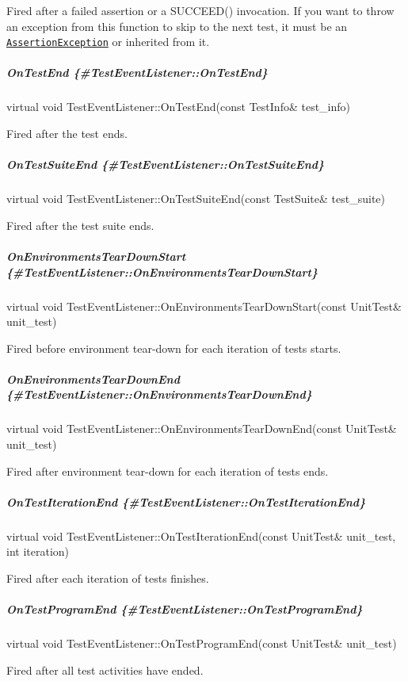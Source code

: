Fired after a failed assertion or a {\ttfamily S\+U\+C\+C\+E\+E\+D()} invocation. If you want to throw an exception from this function to skip to the next test, it must be an \href{#AssertionException}{\tt {\ttfamily Assertion\+Exception}} or inherited from it.

\subparagraph*{On\+Test\+End \{\#\+Test\+Event\+Listener\+::\+On\+Test\+End\}}

{\ttfamily virtual void Test\+Event\+Listener\+::\+On\+Test\+End(const Test\+Info\& test\+\_\+info)}

Fired after the test ends.

\subparagraph*{On\+Test\+Suite\+End \{\#\+Test\+Event\+Listener\+::\+On\+Test\+Suite\+End\}}

{\ttfamily virtual void Test\+Event\+Listener\+::\+On\+Test\+Suite\+End(const Test\+Suite\& test\+\_\+suite)}

Fired after the test suite ends.

\subparagraph*{On\+Environments\+Tear\+Down\+Start \{\#\+Test\+Event\+Listener\+::\+On\+Environments\+Tear\+Down\+Start\}}

{\ttfamily virtual void Test\+Event\+Listener\+::\+On\+Environments\+Tear\+Down\+Start(const Unit\+Test\& unit\+\_\+test)}

Fired before environment tear-\/down for each iteration of tests starts.

\subparagraph*{On\+Environments\+Tear\+Down\+End \{\#\+Test\+Event\+Listener\+::\+On\+Environments\+Tear\+Down\+End\}}

{\ttfamily virtual void Test\+Event\+Listener\+::\+On\+Environments\+Tear\+Down\+End(const Unit\+Test\& unit\+\_\+test)}

Fired after environment tear-\/down for each iteration of tests ends.

\subparagraph*{On\+Test\+Iteration\+End \{\#\+Test\+Event\+Listener\+::\+On\+Test\+Iteration\+End\}}

{\ttfamily virtual void Test\+Event\+Listener\+::\+On\+Test\+Iteration\+End(const Unit\+Test\& unit\+\_\+test, int iteration)}

Fired after each iteration of tests finishes.

\subparagraph*{On\+Test\+Program\+End \{\#\+Test\+Event\+Listener\+::\+On\+Test\+Program\+End\}}

{\ttfamily virtual void Test\+Event\+Listener\+::\+On\+Test\+Program\+End(const Unit\+Test\& unit\+\_\+test)}

Fired after all test activities have ended.

